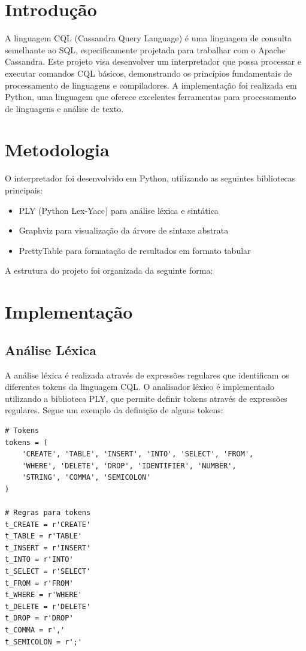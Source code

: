 \documentclass[12pt]{article}
\begin{document}
\section{Introdução}
A linguagem CQL (Cassandra Query Language) é uma linguagem de consulta semelhante ao SQL, 
especificamente projetada para trabalhar com o Apache Cassandra. Este projeto visa desenvolver 
um interpretador que possa processar e executar comandos CQL básicos, demonstrando os princípios 
fundamentais de processamento de linguagens e compiladores. A implementação foi realizada em Python,
uma linguagem que oferece excelentes ferramentas para processamento de linguagens e análise de texto.

\section{Metodologia}
O interpretador foi desenvolvido em Python, utilizando as seguintes bibliotecas principais:
\begin{itemize}
    \item PLY (Python Lex-Yacc) para análise léxica e sintática
    \item Graphviz para visualização da árvore de sintaxe abstrata
    \item PrettyTable para formatação de resultados em formato tabular
\end{itemize}

A estrutura do projeto foi organizada da seguinte forma:


\section{Implementação}
\subsection{Análise Léxica}
A análise léxica é realizada através de expressões regulares que identificam os diferentes 
tokens da linguagem CQL. O analisador léxico é implementado utilizando a biblioteca PLY, 
que permite definir tokens através de expressões regulares. Segue um exemplo da definição 
de alguns tokens:

\begin{verbatim}
# Tokens
tokens = (
    'CREATE', 'TABLE', 'INSERT', 'INTO', 'SELECT', 'FROM',
    'WHERE', 'DELETE', 'DROP', 'IDENTIFIER', 'NUMBER',
    'STRING', 'COMMA', 'SEMICOLON'
)

# Regras para tokens
t_CREATE = r'CREATE'
t_TABLE = r'TABLE'
t_INSERT = r'INSERT'
t_INTO = r'INTO'
t_SELECT = r'SELECT'
t_FROM = r'FROM'
t_WHERE = r'WHERE'
t_DELETE = r'DELETE'
t_DROP = r'DROP'
t_COMMA = r','
t_SEMICOLON = r';'
\end{verbatim}
\end{document}
